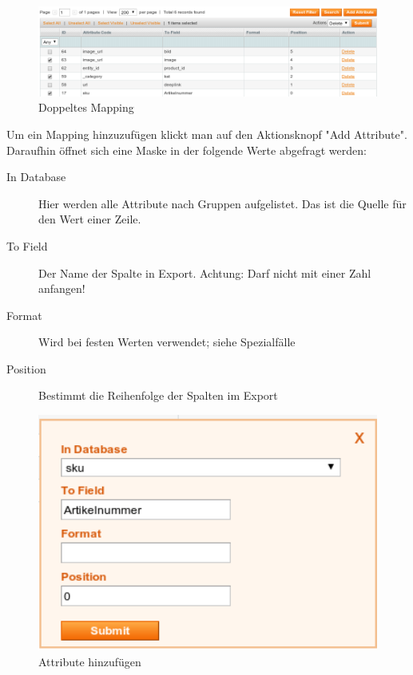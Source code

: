 \documentclass[a4paper,12pt]{book}
\begin{document}
\begin{figure}
 \includegraphics[width=1\textwidth]{img/bild07.png}
  \caption{Doppeltes Mapping}
  \label{figure:double_mapping}
\end{figure}

Um ein Mapping hinzuzufügen klickt man auf den Aktionsknopf "Add
Attribute". Daraufhin öffnet sich eine Maske in der folgende Werte
abgefragt werden:

\begin{description}

\item[In Database] Hier werden alle Attribute nach Gruppen aufgelistet.
Das ist die Quelle für den Wert einer Zeile.

\item[To Field] Der Name der Spalte in Export. Achtung: Darf nicht mit
einer Zahl anfangen!

\item[Format] Wird bei festen Werten verwendet; siehe Spezialfälle

\item[Position] Bestimmt die Reihenfolge der Spalten im Export
\end{description}

\begin{figure}
 \includegraphics[width=1\textwidth]{img/bild06.png}
  \caption{Attribute hinzufügen}
  \label{figure:add_attribute}
\end{figure}
\end{document}
